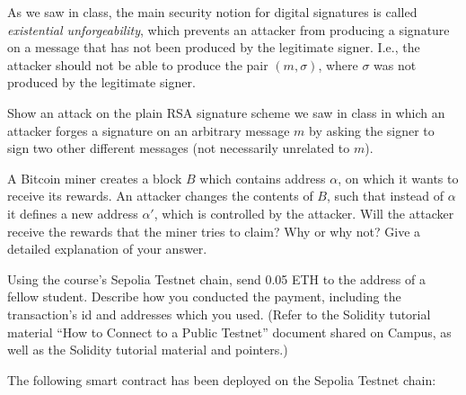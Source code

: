 \documentclass[12pt,addpoints,answers]{exam}
\begin{document}
\begin{questions}
\newpage

\question[10] As we saw in class, the main security notion for digital signatures is called {\em existential unforgeability}, which prevents an attacker from producing a signature on a message that has not been produced by the legitimate signer. I.e., the attacker should not be able to produce the pair $(m, \sigma)$, where $\sigma$ was not produced by the legitimate signer. 

Show an attack on the plain RSA signature scheme we saw in class in which an attacker forges a signature on an arbitrary message $m$ by asking the signer to sign two other different messages (not necessarily unrelated to $m$).

    

\newpage

\question[10] A Bitcoin miner creates a block $B$ which contains address $\alpha$, on which it wants to receive its rewards. An attacker changes the contents of $B$, such that instead of $\alpha$ it defines a new address $\alpha'$, which is controlled by the attacker. Will the attacker receive the rewards that the miner tries to claim? Why or why not? Give a detailed explanation of your answer.

    

\newpage

\question[10] Using the course’s Sepolia  Testnet chain, send 0.05 ETH to the address of a fellow student. Describe how you conducted the payment, including the transaction’s id and addresses which you used. (Refer to the Solidity tutorial material “How to Connect
to a Public Testnet” document shared on Campus, as well as the Solidity
tutorial material and pointers.) 

    

\newpage
  
\question The following smart contract has been deployed on the Sepolia Testnet chain:

{\footnotesize

}
\end{questions}
\end{document}
